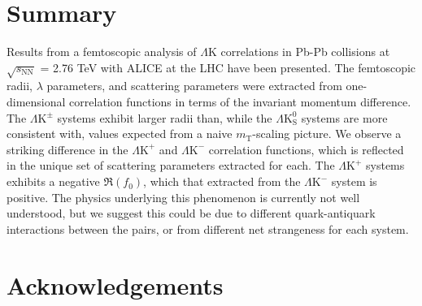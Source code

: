 \documentclass[ALICE,manyauthors]{cernphprep}
\newcommand{\mt}{$m_{\mathrm{T}}$\xspace}
\newcommand{\LamK}{$\Lambda$K\xspace}
\newcommand{\LamKchP}{$\Lambda\mathrm{K^{+}}$\xspace}
\newcommand{\LamKchM}{$\Lambda\mathrm{K^{-}}$\xspace}
\newcommand{\LamKpm}{$\Lambda\mathrm{K^{\pm}}$\xspace}
\newcommand{\LamKs}{$\Lambda\mathrm{K^{0}_{S}}$\xspace}
\begin{document}
\section{Summary}
\label{sec:Summary}

Results from a femtoscopic analysis of \LamK correlations in Pb-Pb collisions at $\sqrt{s_{\mathrm{NN}}}$ = 2.76 TeV with ALICE at the LHC have been presented.
The femtoscopic radii, $\lambda$ parameters, and scattering parameters were extracted from one-dimensional correlation functions in terms of the invariant momentum difference.
The \LamKpm systems exhibit larger radii than, while the \LamKs systems are more consistent with, values expected from a naive \mt-scaling picture.
We observe a striking difference in the \LamKchP and \LamKchM correlation functions, which is reflected in the unique set of scattering parameters extracted for each.
The \LamKchP systems exhibits a negative $\Re(f_{0})$, which that extracted from the \LamKchM system is positive.
The physics underlying this phenomenon is currently not well understood, but we suggest this could be due to different quark-antiquark interactions between the pairs, or from different net strangeness for each system.

\clearpage

\newenvironment{acknowledgement}{\relax}{\relax}
\begin{acknowledgement}
\section*{Acknowledgements}
\end{acknowledgement}



\newpage
\appendix
%
%
\end{document}
